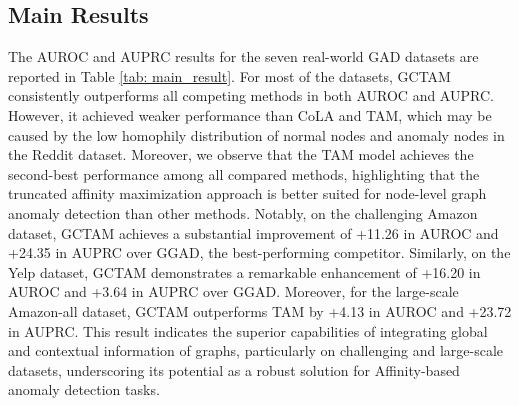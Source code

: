 \documentclass{article}
\begin{document}
\subsection{Main Results}
The AUROC and AUPRC results for the seven real-world GAD datasets are reported in Table \ref{tab: main_result}. For most of the datasets, GCTAM consistently outperforms all competing methods in both AUROC and AUPRC. However, it achieved weaker performance than CoLA and TAM, which may be caused by the low homophily distribution of normal nodes and anomaly nodes in the Reddit dataset.
Moreover, we observe that the TAM model achieves the second-best performance among all compared methods, highlighting that the truncated affinity maximization approach is better suited for node-level graph anomaly detection than other methods.
Notably, on the challenging Amazon dataset, GCTAM achieves a substantial improvement of +11.26 in AUROC and +24.35 in AUPRC over GGAD, the best-performing competitor. Similarly, on the Yelp dataset, GCTAM demonstrates a remarkable enhancement of +16.20 in AUROC and +3.64 in AUPRC over GGAD. Moreover, for the large-scale Amazon-all dataset, GCTAM outperforms TAM by +4.13 in AUROC and +23.72 in AUPRC. 
This result indicates the superior capabilities of integrating global and contextual information of graphs, particularly on challenging and large-scale datasets, underscoring its potential as a robust solution for Affinity-based anomaly detection tasks.




\end{document}
